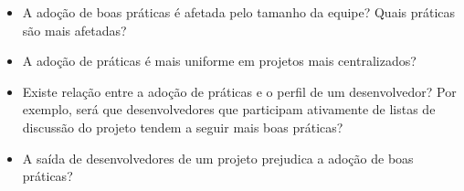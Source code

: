 \documentclass{article}
\begin{document}
\begin{itemize}
  \item A adoção de boas práticas é afetada pelo tamanho da equipe? Quais
práticas são mais afetadas?
  \item A adoção de práticas é mais uniforme em projetos mais centralizados?
  \item Existe relação entre a adoção de práticas e o perfil de um
desenvolvedor? Por exemplo, será que desenvolvedores que participam ativamente
de listas de discussão do projeto tendem a seguir mais boas práticas?
  \item A saída de desenvolvedores de um projeto prejudica a adoção de boas
práticas?
\end{itemize}


\end{document}
